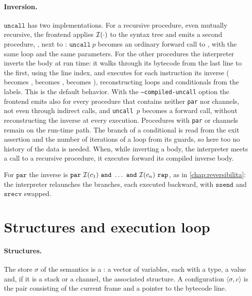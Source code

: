 \paragraph{Inversion.} $\mathtt{uncall}$ has two implementations. For a
recursive procedure, even mutually recursive, the frontend applies $\mathcal{I}(\cdot)$
to the syntax tree and emits a second procedure, , next to
: $\mathtt{uncall}\ p$ becomes an ordinary forward call to
, with the same loop and the same parameters. For the other
procedures the interpreter inverts the body at run time: it walks through its
bytecode from the last line to the first, using the line index, and executes
for each instruction its inverse ( becomes ,
 becomes ,  becomes ),
reconstructing loops and conditionals from the labels. This is the default
behavior. With the \texttt{--compiled-uncall} option the frontend emits
 also for every procedure that contains neither \texttt{par} nor
channels, not even through indirect calls, and \texttt{uncall}~$p$ becomes a
forward call, without reconstructing the inverse at every execution. Procedures
with \texttt{par} or channels remain on the run-time path. The branch of a
conditional is read from the exit assertion and the number of iterations of a
loop from its guards, so here too no history of the data is needed. When,
while inverting a body, the interpreter meets a call to a recursive procedure, it
executes forward its compiled inverse body.

\noindent
For $\mathtt{par}$ the inverse is $\mathtt{par}\ \Inv{c_1}\ \mathtt{and}\
\dots\ \mathtt{and}\ \Inv{c_n}\ \mathtt{rap}$, as in \cref{chap:reversibilita}:
the interpreter relaunches the branches, each executed backward, with
$\mathtt{ssend}$ and $\mathtt{srecv}$ swapped.

\section{Structures and execution loop}
\label{sec:interprete}

\paragraph{Structures.} The store $\sigma$ of the semantics is a : a
vector of variables, each with a type, a value and, if it is a stack or a channel,
the associated structure. A configuration $\langle \sigma, c\rangle$ is the pair
consisting of the current frame and a pointer to the bytecode line.

